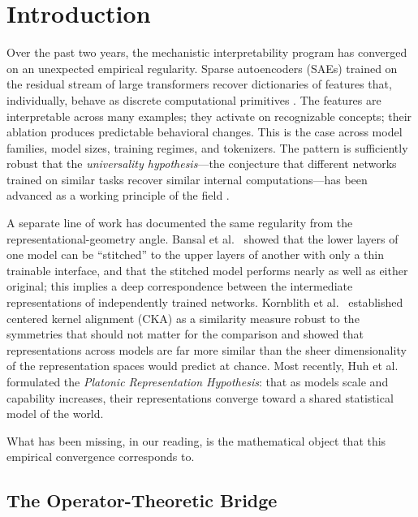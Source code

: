 \section{Introduction}
\label{sec:intro}

Over the past two years, the mechanistic interpretability program has
converged on an unexpected empirical regularity. Sparse autoencoders
(SAEs) trained on the residual stream of large transformers recover
dictionaries of features that, individually, behave as discrete
computational primitives \cite{bricken2023monosemanticity,
cunningham2024sparse, templeton2024scaling, gao2024scaling}. The
features are interpretable across many examples; they activate on
recognizable concepts; their ablation produces predictable behavioral
changes. This is the case across model families, model sizes, training
regimes, and tokenizers. The pattern is sufficiently robust that the
\emph{universality hypothesis}---the conjecture that different networks
trained on similar tasks recover similar internal computations---has
been advanced as a working principle of the field
\cite{olah2020zoom, chughtai2023toy, gurnee2024universal}.

A separate line of work has documented the same regularity from the
representational-geometry angle. Bansal et al.~\cite{bansal2021revisiting}
showed that the lower layers of one model can be ``stitched'' to the
upper layers of another with only a thin trainable interface, and that
the stitched model performs nearly as well as either original; this
implies a deep correspondence between the intermediate representations
of independently trained networks. Kornblith et al.~\cite{kornblith2019similarity}
established centered kernel alignment (CKA) as a similarity measure
robust to the symmetries that should not matter for the comparison and
showed that representations across models are far more similar than the
sheer dimensionality of the representation spaces would predict at
chance. Most recently, Huh et al.~\cite{huh2024platonic} formulated the
\emph{Platonic Representation Hypothesis}: that as models scale and
capability increases, their representations converge toward a shared
statistical model of the world.

What has been missing, in our reading, is the mathematical object that
this empirical convergence corresponds to.

\subsection*{The Operator-Theoretic Bridge}

